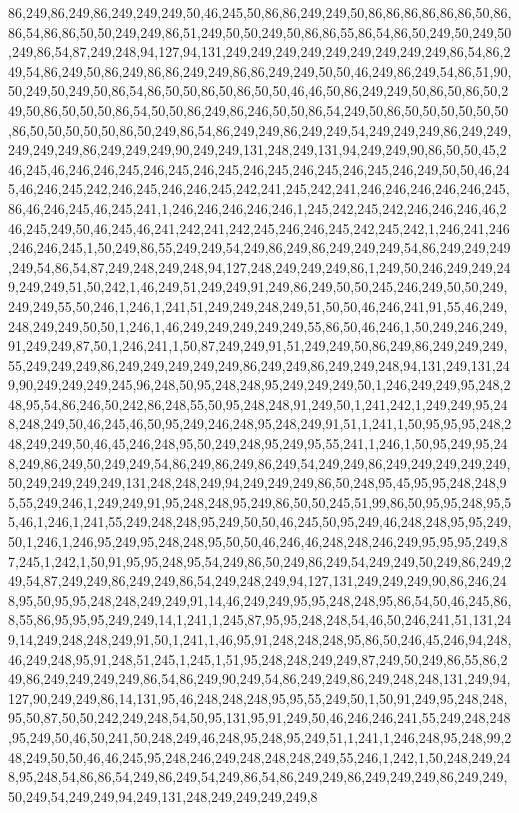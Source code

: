 86,249,86,249,86,249,249,249,50,46,245,50,86,86,249,249,50,86,86,86,86,86,86,50,86,86,54,86,86,50,50,249,249,86,51,249,50,50,249,50,86,86,55,86,54,86,50,249,50,249,50,249,86,54,87,249,248,94,127,94,131,249,249,249,249,249,249,249,249,249,86,54,86,249,54,86,249,50,86,249,86,86,249,249,86,86,249,249,50,50,46,249,86,249,54,86,51,90,50,249,50,249,50,86,54,86,50,50,86,50,86,50,50,46,46,50,86,249,249,50,86,50,86,50,249,50,86,50,50,50,86,54,50,50,86,249,86,246,50,50,86,54,249,50,86,50,50,50,50,50,50,86,50,50,50,50,50,86,50,249,86,54,86,249,249,86,249,249,54,249,249,249,86,249,249,249,249,249,86,249,249,249,90,249,249,131,248,249,131,94,249,249,90,86,50,50,45,246,245,46,246,246,245,246,245,246,245,246,245,246,245,246,245,246,249,50,50,46,245,46,246,245,242,246,245,246,246,245,242,241,245,242,241,246,246,246,246,246,245,86,46,246,245,46,245,241,1,246,246,246,246,246,1,245,242,245,242,246,246,246,46,246,245,249,50,46,245,46,241,242,241,242,245,246,246,245,242,245,242,1,246,241,246,246,246,245,1,50,249,86,55,249,249,54,249,86,249,86,249,249,249,54,86,249,249,249,249,54,86,54,87,249,248,249,248,94,127,248,249,249,249,86,1,249,50,246,249,249,249,249,249,51,50,242,1,46,249,51,249,249,91,249,86,249,50,50,245,246,249,50,50,249,249,249,55,50,246,1,246,1,241,51,249,249,248,249,51,50,50,46,246,241,91,55,46,249,248,249,249,50,50,1,246,1,46,249,249,249,249,249,55,86,50,46,246,1,50,249,246,249,91,249,249,87,50,1,246,241,1,50,87,249,249,91,51,249,249,50,86,249,86,249,249,249,55,249,249,249,86,249,249,249,249,249,86,249,249,86,249,249,248,94,131,249,131,249,90,249,249,249,245,96,248,50,95,248,248,95,249,249,249,50,1,246,249,249,95,248,248,95,54,86,246,50,242,86,248,55,50,95,248,248,91,249,50,1,241,242,1,249,249,95,248,248,249,50,46,245,46,50,95,249,246,248,95,248,249,91,51,1,241,1,50,95,95,95,248,248,249,249,50,46,45,246,248,95,50,249,248,95,249,95,55,241,1,246,1,50,95,249,95,248,249,86,249,50,249,249,54,86,249,86,249,86,249,54,249,249,86,249,249,249,249,249,50,249,249,249,249,131,248,248,249,94,249,249,249,86,50,248,95,45,95,95,248,248,95,55,249,246,1,249,249,91,95,248,248,95,249,86,50,50,245,51,99,86,50,95,95,248,95,55,46,1,246,1,241,55,249,248,248,95,249,50,50,46,245,50,95,249,46,248,248,95,95,249,50,1,246,1,246,95,249,95,248,248,95,50,50,46,246,46,248,248,246,249,95,95,95,249,87,245,1,242,1,50,91,95,95,248,95,54,249,86,50,249,86,249,54,249,249,50,249,86,249,249,54,87,249,249,86,249,249,86,54,249,248,249,94,127,131,249,249,249,90,86,246,248,95,50,95,95,248,248,249,249,91,14,46,249,249,95,95,248,248,95,86,54,50,46,245,86,8,55,86,95,95,95,249,249,14,1,241,1,245,87,95,95,248,248,54,46,50,246,241,51,131,249,14,249,248,248,249,91,50,1,241,1,46,95,91,248,248,248,95,86,50,246,45,246,94,248,46,249,248,95,91,248,51,245,1,245,1,51,95,248,248,249,249,87,249,50,249,86,55,86,249,86,249,249,249,249,86,54,86,249,90,249,54,86,249,249,86,249,248,248,131,249,94,127,90,249,249,86,14,131,95,46,248,248,248,95,95,55,249,50,1,50,91,249,95,248,248,95,50,87,50,50,242,249,248,54,50,95,131,95,91,249,50,46,246,246,241,55,249,248,248,95,249,50,46,50,241,50,248,249,46,248,95,248,95,249,51,1,241,1,246,248,95,248,99,248,249,50,50,46,46,245,95,248,246,249,248,248,248,249,55,246,1,242,1,50,248,249,248,95,248,54,86,86,54,249,86,249,54,249,86,54,86,249,249,86,249,249,249,86,249,249,50,249,54,249,249,94,249,131,248,249,249,249,249,8